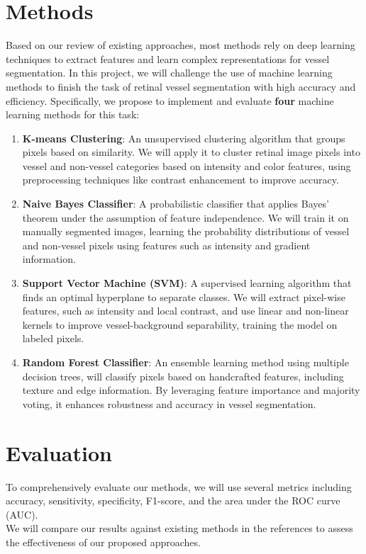 \documentclass[12pt,letterpaper]{article}
\begin{document}
\section{Methods}
Based on our review of existing approaches, most methods rely on deep learning techniques to extract features and learn complex representations for vessel segmentation. 
\newpage
\noindent In this project, we will challenge the use of machine learning methods to finish the task of retinal vessel segmentation with high accuracy and efficiency. Specifically, we propose to implement and evaluate \textbf{four} machine learning methods for this task: 
\begin{enumerate}
    \item \textbf{K-means Clustering}: An unsupervised clustering algorithm that groups pixels based on similarity. We will apply it to cluster retinal image pixels into vessel and non-vessel categories based on intensity and color features, using preprocessing techniques like contrast enhancement to improve accuracy.
    \item \textbf{Naive Bayes Classifier}: A probabilistic classifier that applies Bayes' theorem under the assumption of feature independence. We will train it on manually segmented images, learning the probability distributions of vessel and non-vessel pixels using features such as intensity and gradient information.
    \item \textbf{Support Vector Machine (SVM)}: A supervised learning algorithm that finds an optimal hyperplane to separate classes. We will extract pixel-wise features, such as intensity and local contrast, and use linear and non-linear kernels to improve vessel-background separability, training the model on labeled pixels.
    \item \textbf{Random Forest Classifier}: An ensemble learning method using multiple decision trees, will classify pixels based on handcrafted features, including texture and edge information. By leveraging feature importance and majority voting, it enhances robustness and accuracy in vessel segmentation.
\end{enumerate}



\section{Evaluation}
To comprehensively evaluate our methods, we will use several metrics including accuracy, sensitivity, specificity, F1-score, and the area under the ROC curve (AUC). \\
We will compare our results against existing methods in the references to assess the effectiveness of our proposed approaches. 
\end{document}
